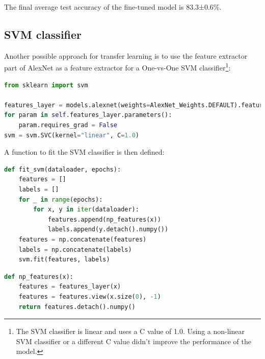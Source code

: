 \documentclass[a4paper, 11pt]{article}
\begin{document}
The final average test accuracy of the fine-tuned model is 83.3±0.6\%.

\subsection{SVM classifier}
Another possible approach for transfer learning is to use the feature extractor part of AlexNet 
as a feature extractor for a One-vs-One SVM classifier\footnote{The SVM classifier is linear and uses a C value of 1.0. Using a non-linear SVM classifier or a different C value didn't improve the performance of the model.}:
\begin{lstlisting}[language=Python]
from sklearn import svm

features_layer = models.alexnet(weights=AlexNet_Weights.DEFAULT).features
for param in self.features_layer.parameters():
    param.requires_grad = False
svm = svm.SVC(kernel="linear", C=1.0)
\end{lstlisting}
A function to fit the SVM classifier is then defined:
\begin{lstlisting}[language=Python]
def fit_svm(dataloader, epochs):
    features = []
    labels = []
    for _ in range(epochs):
        for x, y in iter(dataloader):
            features.append(np_features(x))
            labels.append(y.detach().numpy())
    features = np.concatenate(features)
    labels = np.concatenate(labels)
    svm.fit(features, labels)
\end{lstlisting}
\pagebreak
\begin{lstlisting}[language=Python]
def np_features(x):
    features = features_layer(x)
    features = features.view(x.size(0), -1)
    return features.detach().numpy()
\end{lstlisting}
\end{document}

